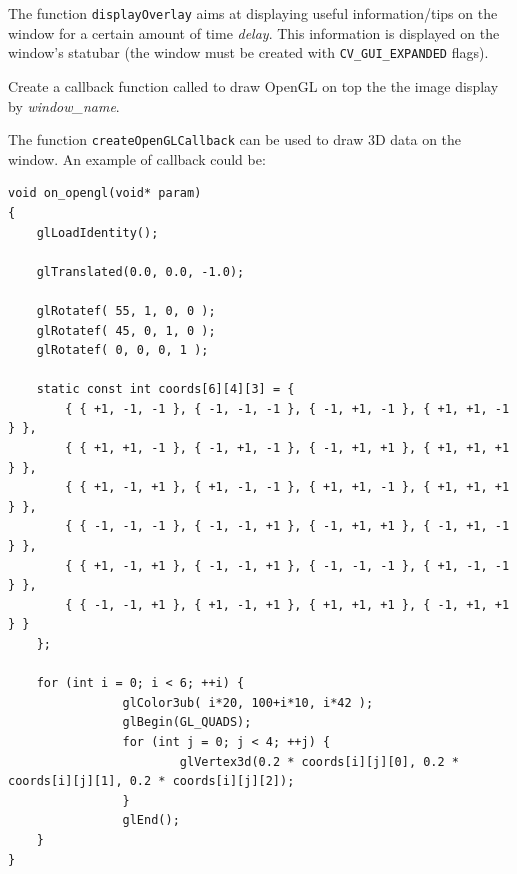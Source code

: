 The function \texttt{displayOverlay} aims at displaying useful information/tips on the window for a certain amount of time \emph{delay}. This information is displayed on the window's statubar (the window must be created with \texttt{CV\_GUI\_EXPANDED} flags).



Create a callback function called to draw OpenGL on top the the image display by \emph{window\_name}.

\begin{description}
\end{description}

The function \texttt{createOpenGLCallback} can be used to draw 3D data on the window.  An example of callback could be:
\begin{lstlisting}
void on_opengl(void* param)
{
    glLoadIdentity();

    glTranslated(0.0, 0.0, -1.0);

    glRotatef( 55, 1, 0, 0 );
    glRotatef( 45, 0, 1, 0 );
    glRotatef( 0, 0, 0, 1 );

    static const int coords[6][4][3] = {
        { { +1, -1, -1 }, { -1, -1, -1 }, { -1, +1, -1 }, { +1, +1, -1 } },
        { { +1, +1, -1 }, { -1, +1, -1 }, { -1, +1, +1 }, { +1, +1, +1 } },
        { { +1, -1, +1 }, { +1, -1, -1 }, { +1, +1, -1 }, { +1, +1, +1 } },
        { { -1, -1, -1 }, { -1, -1, +1 }, { -1, +1, +1 }, { -1, +1, -1 } },
        { { +1, -1, +1 }, { -1, -1, +1 }, { -1, -1, -1 }, { +1, -1, -1 } },
        { { -1, -1, +1 }, { +1, -1, +1 }, { +1, +1, +1 }, { -1, +1, +1 } }
    };

    for (int i = 0; i < 6; ++i) {
                glColor3ub( i*20, 100+i*10, i*42 );
                glBegin(GL_QUADS);
                for (int j = 0; j < 4; ++j) {
                        glVertex3d(0.2 * coords[i][j][0], 0.2 * coords[i][j][1], 0.2 * coords[i][j][2]);
                }
                glEnd();
    }
}
\end{lstlisting}


